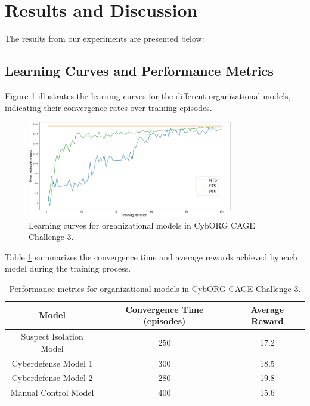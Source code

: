 \documentclass[conference]{IEEEtran}
\begin{document}
\section{Results and Discussion}

The results from our experiments are presented below:

\subsection{Learning Curves and Performance Metrics}

Figure \ref{fig:learning_curves} illustrates the learning curves for the different organizational models, indicating their convergence rates over training episodes.

\begin{figure}[ht]
    \centering
    \includegraphics[width=0.8\textwidth]{figures/prahom_learning_curve.png}
    \caption{Learning curves for organizational models in CybORG CAGE Challenge 3.}
    \label{fig:learning_curves}
\end{figure}

Table \ref{tab:results} summarizes the convergence time and average rewards achieved by each model during the training process.

\begin{table}[ht]
    \centering
    \begin{tabular}{|c|c|c|}
        \hline
        Model                   & Convergence Time (episodes) & Average Reward \\
        \hline
        Suspect Isolation Model & 250                         & 17.2           \\
        Cyberdefense Model 1    & 300                         & 18.5           \\
        Cyberdefense Model 2    & 280                         & 19.8           \\
        Manual Control Model    & 400                         & 15.6           \\
        \hline
    \end{tabular}
    \caption{Performance metrics for organizational models in CybORG CAGE Challenge 3.}
    \label{tab:results}
\end{table}
\end{document}
